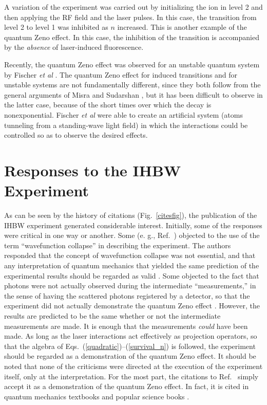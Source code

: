 \documentclass[12pt]{article}
\begin{document}
A variation of the experiment was carried out by initializing the
ion in level 2 and then applying the RF field and the laser pulses.
In this case, the transition from level 2 to level 1 was inhibited
as $n$ increased.  This is another example of the quantum Zeno
effect.  In this case, the inhibition of the transition is
accompanied by the {\em absence} of laser-induced fluorescence.

Recently, the quantum Zeno effect was observed for an unstable
quantum system by Fischer {\em et al} \cite{fischer01}. The quantum
Zeno effect for induced transitions and for unstable systems are not
fundamentally different, since they both follow from the general
arguments of Misra and Sudarshan \cite{misra77}, but it has been
difficult to observe in the latter case, because of the short times
over which the decay is nonexponential. Fischer {\em et al} were
able to create an artificial system (atoms tunneling from a
standing-wave light field) in which the interactions could be
controlled so as to observe the desired effects.



\section{Responses to the IHBW Experiment}

As can be seen by the history of citations (Fig.~\ref{citesfig}),
the publication of the IHBW experiment \cite{itano90} generated
considerable interest.  Initially, some of the responses were
critical in one way or another.  Some (e. g.,
Ref.~\cite{ballentine91}) objected to the use of the term
``wavefunction collapse'' in describing the experiment.  The authors
responded that the concept of wavefunction collapse was not
essential, and that any interpretation of quantum mechanics that
yielded the same prediction of the experimental results should be
regarded as valid \cite{itano91}.  Some objected to the fact that
photons were not actually observed during the intermediate
``measurements,'' in the sense of having the scattered photons
registered by a detector, so that the experiment did not actually
demonstrate the quantum Zeno effect
\cite{ballentine91,petrosky90,inagaki92,pascazio93}. However, the
results are predicted to be the same whether or not the intermediate
measurements are made. It is enough that the measurements {\em
could} have been made.   As long as the laser interactions act
effectively as projection operators, so that the algebra of
Eqs.~(\ref{quadratic})--(\ref{survival_n}) is followed, the
experiment should be regarded as a demonstration of the quantum Zeno
effect. It should be noted that none of the criticisms were directed
at the execution of the experiment itself, only at the
interpretation. For the most part, the citations to
Ref.~\cite{itano90} simply accept it as a demonstration of the
quantum Zeno effect.  In fact, it is cited in quantum mechanics
textbooks \cite{griffiths95,sakurai94,peres93,braginsky92} and
popular science books \cite{whitaker96,coveney90,schulman97}.
\end{document}
